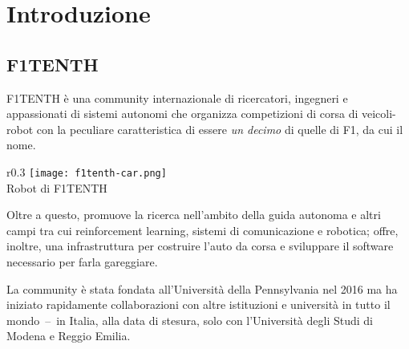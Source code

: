 
\chapter{Introduzione}
\label{chap:intro}


\section{F1TENTH}
F1TENTH è una community internazionale di ricercatori, ingegneri e appassionati di sistemi autonomi
che organizza competizioni di corsa di veicoli-robot con la peculiare caratteristica
di essere \textit{un decimo} di quelle di F1, da cui il nome.
\begin{wrapfigure}{r}{0.3\textwidth}
	\centering
	\texttt{[image: f1tenth-car.png]}
	{\footnotesize \\Robot di F1TENTH \cite{overview}}
\end{wrapfigure}
Oltre a questo, promuove la ricerca nell'ambito della guida autonoma
e altri campi tra cui reinforcement learning, sistemi di comunicazione e robotica;
offre, inoltre, una infrastruttura per costruire l'auto da corsa
e sviluppare il software necessario per farla gareggiare. \cite{f1tenth-web}

La community è stata fondata all'Università della Pennsylvania nel 2016 ma ha iniziato rapidamente
collaborazioni con altre istituzioni e università in tutto il mondo~--~in Italia, alla data di stesura, solo
con l'Università degli Studi di Modena e Reggio Emilia. \cite{f1tenth-about}

